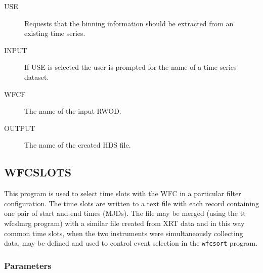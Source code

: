 \begin{description}

\item[USE]
Requests that the binning information should be extracted from an
existing time series.

\item[INPUT]
If USE is selected the user is prompted for the name of a time series
dataset.

\item[WFCF]
The name of the input RWOD.

\item[OUTPUT]
The name of the created HDS file.

\end{description}

\subsection{WFCSLOTS}
\label{sec:programs:wfcslots}

This program is used to select time slots with the WFC in a particular
filter configuration. The time slots are written to a text file with
each record containing one pair of start and end times (MJDs). The file
may be merged (using the {tt wfcslmrg} program) with a similar file created
from XRT data and in this way common time slots, when the two instruments
were simultaneously collecting data, may be defined and used to control
event selection in the {\tt wfcsort} program.

\subsubsection{Parameters}

